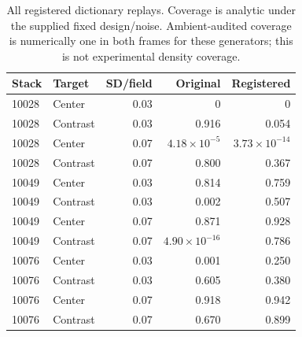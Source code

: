 \begin{table}[t]
\centering\footnotesize\setlength{\tabcolsep}{3pt}
\caption{All registered dictionary replays. Coverage is analytic under the supplied fixed design/noise. Ambient-audited coverage is numerically one in both frames for these generators; this is not experimental density coverage.}
\begin{tabular}{llrrr}
\toprule
Stack & Target & SD/field & Original & Registered \\
\midrule
10028 & Center & 0.03 & 0 & 0 \\
10028 & Contrast & 0.03 & 0.916 & 0.054 \\
10028 & Center & 0.07 & $4.18\times10^{-5}$ & $3.73\times10^{-14}$ \\
10028 & Contrast & 0.07 & 0.800 & 0.367 \\
10049 & Center & 0.03 & 0.814 & 0.759 \\
10049 & Contrast & 0.03 & 0.002 & 0.507 \\
10049 & Center & 0.07 & 0.871 & 0.928 \\
10049 & Contrast & 0.07 & $4.90\times10^{-16}$ & 0.786 \\
10076 & Center & 0.03 & 0.001 & 0.250 \\
10076 & Contrast & 0.03 & 0.605 & 0.380 \\
10076 & Center & 0.07 & 0.918 & 0.942 \\
10076 & Contrast & 0.07 & 0.670 & 0.899 \\
\bottomrule
\end{tabular}
\end{table}
